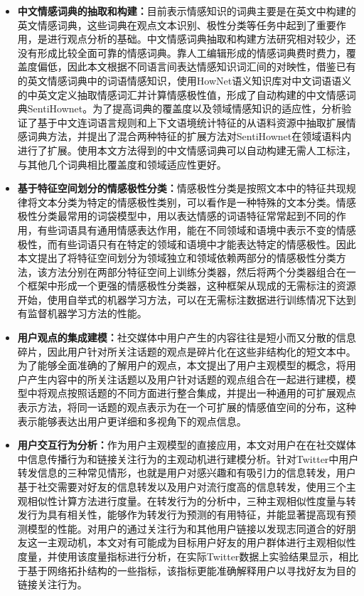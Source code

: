 \begin{cabstract}
\begin{itemize}
\item \textbf{中文情感词典的抽取和构建：}目前表示情感知识的词典主要是在英文中构建的英文情感词典，这些词典在观点文本识别、极性分类等任务中起到了重要作用，是进行观点分析的基础。中文情感词典抽取和构建方法研究相对较少，还没有形成比较全面可靠的情感词典。靠人工编辑形成的情感词典费时费力，覆盖度偏低，因此本文根据不同语言间表达情感知识词汇间的对映性，借鉴已有的英文情感词典中的词语情感知识，使用HowNet语义知识库对中文词语语义的中英文定义抽取情感词汇并计算情感极性值，形成了自动构建的中文情感词典SentiHownet。为了提高词典的覆盖度以及领域情感知识的适应性，分析验证了基于中文连词语言规则和上下文语境统计特征的从语料资源中抽取扩展情感词典方法，并提出了混合两种特征的扩展方法对SentiHownet在领域语料内进行了扩展。使用本文方法得到的中文情感词典可以自动构建无需人工标注，与其他几个词典相比覆盖度和领域适应性更好。
\item \textbf{基于特征空间划分的情感极性分类：}情感极性分类是按照文本中的特征共现规律将文本分类为特定的情感极性类别，可以看作是一种特殊的文本分类。情感极性分类最常用的词袋模型中，用以表达情感的词语特征常常起到不同的作用，有些词语具有通用情感表达作用，能在不同领域和语境中表示不变的情感极性，而有些词语只有在特定的领域和语境中才能表达特定的情感极性。因此本文提出了将特征空间划分为领域独立和领域依赖两部分的情感极性分类方法，该方法分别在两部分特征空间上训练分类器，然后将两个分类器组合在一个框架中形成一个更强的情感极性分类器，这种框架从现成的无需标注的资源开始，使用自举式的机器学习方法，可以在无需标注数据进行训练情况下达到有监督机器学习方法的性能。
\item \textbf{用户观点的集成建模：}社交媒体中用户产生的内容往往是短小而又分散的信息碎片，因此用户针对所关注话题的观点是碎片化在这些非结构化的短文本中。为了能够全面准确的了解用户的观点，本文提出了用户主观模型的概念，将用户产生内容中的所关注话题以及用户针对话题的观点组合在一起进行建模，模型中将观点按照话题的不同方面进行整合集成，并提出一种通用的可扩展观点表示方法，将同一话题的观点表示为在一个可扩展的情感值空间的分布，这种表示能够表达出用户更详细和多视角下的观点信息。
\item \textbf{用户交互行为分析：}作为用户主观模型的直接应用，本文对用户在在社交媒体中信息传播行为和链接关注行为的主观动机进行建模分析。针对Twitter中用户转发信息的三种常见情形，也就是用户对感兴趣和有吸引力的信息转发，用户基于社交需要对好友的信息转发以及用户对流行度高的信息转发，使用三个主观相似性计算方法进行度量。在转发行为的分析中，三种主观相似性度量与转发行为具有相关性，能够作为转发行为预测的有用特征，并能显著提高现有预测模型的性能。对用户的通过关注行为和其他用户链接以发现志同道合的好朋友这一主观动机，本文对有可能成为目标用户好友的用户群体进行主观相似性度量，并使用该度量指标进行分析，在实际Twitter数据上实验结果显示，相比于基于网络拓扑结构的一些指标，该指标更能准确解释用户以寻找好友为目的链接关注行为。
\end{itemize}


\end{cabstract}
